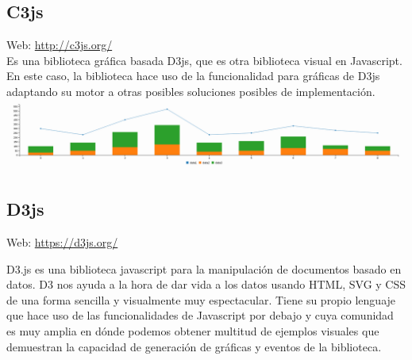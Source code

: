\subsection{C3js}

Web: \url{http://c3js.org/}\\

Es una biblioteca gráfica basada D3js, que es otra biblioteca visual en Javascript. En este caso, la biblioteca hace uso de la funcionalidad para gráficas de D3js adaptando su motor a otras posibles soluciones posibles de implementación.\\

\includegraphics[scale=0.25]{diagramas/c3js-chart.png}

\subsection{D3js}

Web: \url{https://d3js.org/}

D3.js es una biblioteca javascript para la manipulación de documentos basado en datos. D3 nos ayuda a la hora de dar vida a los datos usando HTML, SVG y CSS de una forma sencilla y visualmente muy espectacular. Tiene su propio lenguaje que hace uso de las funcionalidades de Javascript por debajo y cuya comunidad es muy amplia en dónde podemos obtener multitud de ejemplos visuales que demuestran la capacidad de generación de gráficas y eventos de la biblioteca.\\

